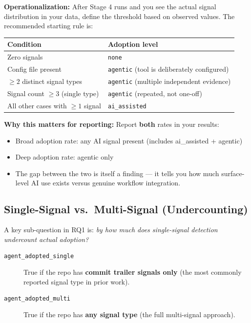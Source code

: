 \documentclass[11pt,a4paper]{article}
\begin{document}
\textbf{Operationalization:} After Stage 4 runs and you see the actual signal distribution in your data, define the threshold based on observed values. The recommended starting rule is:

\begin{center}
\begin{tabular}{ll}
\toprule
\textbf{Condition} & \textbf{Adoption level} \\
\midrule
Zero signals & \texttt{none} \\
Config file present & \texttt{agentic} (tool is deliberately configured) \\
$\geq2$ distinct signal types & \texttt{agentic} (multiple independent evidence) \\
Signal count $\geq3$ (single type) & \texttt{agentic} (repeated, not one-off) \\
All other cases with $\geq1$ signal & \texttt{ai\_assisted} \\
\bottomrule
\end{tabular}
\end{center}

\textbf{Why this matters for reporting:} Report \textbf{both} rates in your results:
\begin{itemize}
    \item Broad adoption rate: any AI signal present (includes ai\_assisted + agentic)
    \item Deep adoption rate: agentic only
    \item The gap between the two is itself a finding — it tells you how much surface-level AI use exists versus genuine workflow integration.
\end{itemize}

\subsection{Single-Signal vs.\ Multi-Signal (Undercounting)}

A key sub-question in RQ1 is: \textit{by how much does single-signal detection undercount actual adoption?}

\begin{description}
    \item[\texttt{agent\_adopted\_single}] True if the repo has \textbf{commit trailer signals only} (the most commonly reported signal type in prior work).
    \item[\texttt{agent\_adopted\_multi}] True if the repo has \textbf{any signal type} (the full multi-signal approach).
\end{description}
\end{document}

